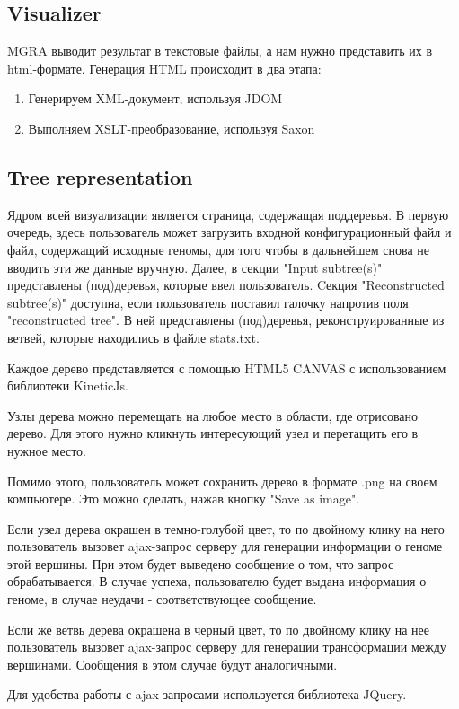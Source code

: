 \documentclass{article}
\begin{document}
\subsection{Visualizer}
MGRA выводит результат в текстовые файлы, а нам нужно представить их в html-формате. Генерация HTML происходит в два этапа: 
\begin{enumerate}
\item Генерируем XML-документ, используя JDOM
\item Выполняем XSLT-преобразование, используя Saxon
\end{enumerate}

\subsection{Tree representation}
Ядром всей визуализации является страница, содержащая поддеревья. 
В первую очередь, здесь пользователь может загрузить входной конфигурационный файл и файл, содержащий исходные геномы, для того чтобы в дальнейшем снова не вводить эти же данные вручную. 
Далее, в секции "Input subtree(s)" представлены (под)деревья, которые ввел пользователь. Cекция "Reconstructed subtree(s)" доступна, если пользователь поставил галочку напротив поля "reconstructed tree". В ней представлены (под)деревья, реконструированные из ветвей, которые находились в файле stats.txt. 

Каждое дерево представляется с помощью HTML5 CANVAS с использованием библиотеки KineticJs. 

Узлы дерева можно перемещать на любое место в области, где отрисовано дерево. Для этого нужно кликнуть интересующий узел и перетащить его в нужное место. 

Помимо этого, пользователь может сохранить дерево в формате .png на своем компьютере. Это можно сделать, нажав кнопку "Save as image". 

Если узел дерева окрашен в темно-голубой цвет, то по двойному клику на него пользователь вызовет ajax-запрос серверу для генерации информации о геноме этой вершины. При этом будет выведено сообщение о том, что запрос обрабатывается. В случае успеха, пользователю будет выдана информация о геноме, в случае неудачи - соответствующее сообщение.

Если же ветвь дерева окрашена в черный цвет, то по двойному клику на нее пользователь вызовет ajax-запрос серверу для генерации трансформации между вершинами. Сообщения в этом случае будут аналогичными.

Для удобства работы с ajax-запросами используется библиотека JQuery. \\
\end{document}
